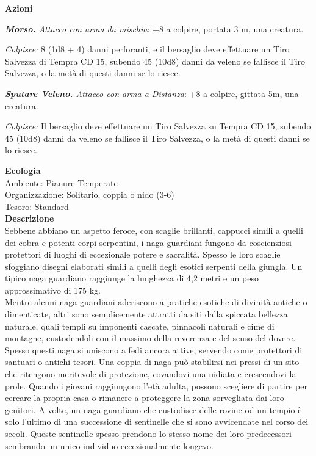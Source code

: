 \begin{multicols}{2}
\textbf{Azioni}

\emph{\textbf{Morso.} Attacco con arma da mischia}: +8 a colpire, portata 3 m, una creatura.

\emph{Colpisce:} 8 (1d8 + 4) danni perforanti, e il bersaglio deve effettuare un Tiro Salvezza di Tempra CD 15, subendo 45 (10d8) danni da veleno se fallisce il Tiro Salvezza, o la metà di questi danni se lo riesce.

\emph{\textbf{Sputare Veleno.} Attacco con arma a Distanza}: +8 a colpire, gittata 5m, una creatura.

\emph{Colpisce:} Il bersaglio deve effettuare un Tiro Salvezza su Tempra CD 15, subendo 45 (10d8) danni da veleno se fallisce il Tiro Salvezza, o la metà di questi danni se lo riesce.

\textbf{Ecologia}\\
Ambiente: Pianure Temperate\\
Organizzazione: Solitario, coppia o nido (3-6)\\
Tesoro: Standard\\
\textbf{Descrizione}\\
Sebbene abbiano un aspetto feroce, con scaglie brillanti, cappucci simili a quelli dei cobra e potenti corpi serpentini, i naga guardiani fungono da coscienziosi protettori di luoghi di eccezionale potere e sacralità. Spesso le loro scaglie sfoggiano disegni elaborati simili a quelli degli esotici serpenti della giungla. Un tipico naga guardiano raggiunge la lunghezza di 4,2 metri e un peso approssimativo di 175 kg.\\
Mentre alcuni naga guardiani aderiscono a pratiche esotiche di divinità antiche o dimenticate, altri sono semplicemente attratti da siti dalla spiccata bellezza naturale, quali templi su imponenti cascate, pinnacoli naturali e cime di montagne, custodendoli con il massimo della reverenza e del senso del dovere. Spesso questi naga si uniscono a fedi ancora attive, servendo come protettori di santuari o antichi tesori. Una coppia di naga può stabilirsi nei pressi di un sito che ritengono meritevole di protezione, covandovi una nidiata e crescendovi la prole. Quando i giovani raggiungono l'età adulta, possono scegliere di partire per cercare la propria casa o rimanere a proteggere la zona sorvegliata dai loro genitori. A volte, un naga guardiano che custodisce delle rovine od un tempio è solo l'ultimo di una successione di sentinelle che si sono avvicendate nel corso dei secoli. Queste sentinelle spesso prendono lo stesso nome dei loro predecessori sembrando un unico individuo eccezionalmente longevo.\\



\end{multicols}
